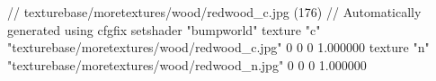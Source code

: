 // texturebase/moretextures/wood/redwood_c.jpg (176)
// Automatically generated using cfgfix
setshader "bumpworld"
texture "c" "texturebase/moretextures/wood/redwood_c.jpg" 0 0 0 1.000000
texture "n" "texturebase/moretextures/wood/redwood_n.jpg" 0 0 0 1.000000
